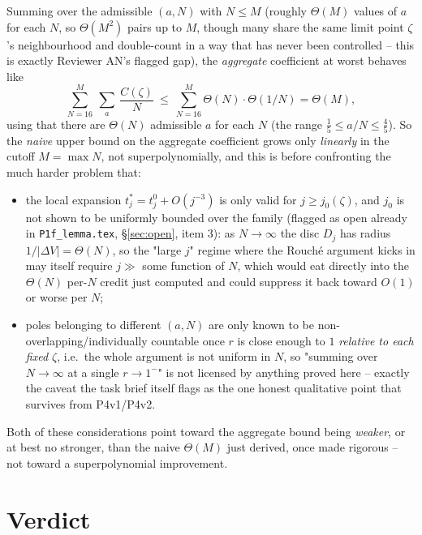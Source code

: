 \documentclass[11pt]{article}
\theoremstyle{remark}
\begin{document}
Summing over the admissible $(a,N)$ with $N\le M$ (roughly $\Theta(M)$ values of $a$ for each $N$,
so $\Theta(M^2)$ pairs up to $M$, though many share the same limit point $\zeta$'s neighbourhood and
double-count in a way that has never been controlled -- this is exactly Reviewer AN's flagged gap),
the \emph{aggregate} coefficient at worst behaves like
\[\sum_{N=16}^{M}\ \sum_{a}\ \frac{C(\zeta)}{N} \ \le\ \sum_{N=16}^{M} \Theta(N)\cdot\Theta(1/N)
= \Theta(M),\]
using that there are $\Theta(N)$ admissible $a$ for each $N$ (the range $\frac15\le a/N\le\frac45$).
So the \emph{naive} upper bound on the aggregate coefficient grows only \emph{linearly} in the
cutoff $M=\max N$, not superpolynomially, and this is before confronting the much harder problem
that:
\begin{itemize}
\item the local expansion $t^*_j=t^0_j+O(j^{-3})$ is only valid for $j\ge j_0(\zeta)$, and
$j_0$ is not shown to be uniformly bounded over the family (flagged as open already in
\texttt{P1f\_lemma.tex}, \S\ref{sec:open}, item 3): as $N\to\infty$ the disc $D_j$ has radius
$1/|\Delta V|=\Theta(N)$, so the "large $j$" regime where the Rouch\'e argument kicks in may itself
require $j\gg $ some function of $N$, which would eat directly into the $\Theta(N)$ per-$N$ credit
just computed and could suppress it back toward $O(1)$ or worse per $N$;
\item poles belonging to different $(a,N)$ are only known to be non-overlapping/individually
countable once $r$ is close enough to $1$ \emph{relative to each fixed $\zeta$}, i.e.\ the whole
argument is not uniform in $N$, so "summing over $N\to\infty$ at a single $r\to1^-$" is not licensed
by anything proved here -- exactly the caveat the task brief itself flags as the one honest
qualitative point that survives from P4v1/P4v2.
\end{itemize}
Both of these considerations point toward the aggregate bound being \emph{weaker}, or at best no
stronger, than the naive $\Theta(M)$ just derived, once made rigorous -- not toward a
superpolynomial improvement.

\section{Verdict}
\end{document}
